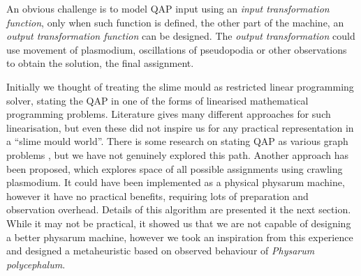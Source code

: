 An obvious challenge is to model QAP input using an \textit{input transformation function}, only when such function is defined, the other part of the machine, an \textit{output transformation function} can be designed. The \textit{output transformation} could use movement of plasmodium, oscillations of pseudopodia or other observations to obtain the solution, the final assignment.

Initially we thought of treating the slime mould as restricted linear programming solver, stating the QAP in one of the forms of linearised mathematical programming problems. Literature gives many different approaches for such linearisation, but even these did not inspire us for any practical representation in a ``slime mould world''. There is some research on stating QAP as various graph problems \cite{cela2013quadratic}, but we have not genuinely explored this path. Another approach has been proposed, which explores space of all possible assignments using crawling plasmodium. It could have been implemented as a physical physarum machine, however it have no practical benefits, requiring lots of preparation and observation overhead. Details of this algorithm are presented it the next section. While it may not be practical, it showed us that we are not capable of designing a better physarum machine, however we took an inspiration from this experience and designed a metaheuristic based on observed behaviour of \textit{Physarum polycephalum}.




